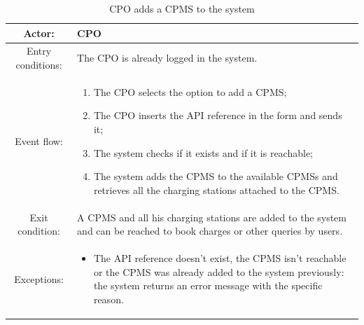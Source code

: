 \begin{table}[h]
    \begin{center}
        \begin{tabular}{|c||p{10cm}|}
            \hline
            Actor:            & \ac{CPO}                                                                                                                        \\
            \hline
            Entry conditions: & The \ac{CPO} is already logged in the system.                                                                                   \\
            \hline
            Event flow:       &
            \begin{enumerate}
                \item The \ac{CPO} selects the option to add a \ac{CPMS};
                \item The \ac{CPO} inserts the \ac{API} reference in the form and sends it;
                \item The system checks if it exists and if it is reachable;
                \item The system adds the \ac{CPMS} to the available \acp{CPMS} and retrieves all the charging stations attached to the \ac{CPMS}.
            \end{enumerate}
            \\
            \hline
            Exit condition:   & A \ac{CPMS} and all his charging stations are added to the system and can be reached to book charges or other queries by users. \\
            \hline
            Exceptions:       &
            \begin{itemize}
                \item The API reference doesn't exist, the \ac{CPMS} isn't reachable or the \ac{CPMS} was already added to the system previously: the system returns an error message with the specific reason.
            \end{itemize}
            \\
            \hline
        \end{tabular}
    \end{center}
    \caption{\ac{CPO} adds a \ac{CPMS} to the system}
\end{table}

